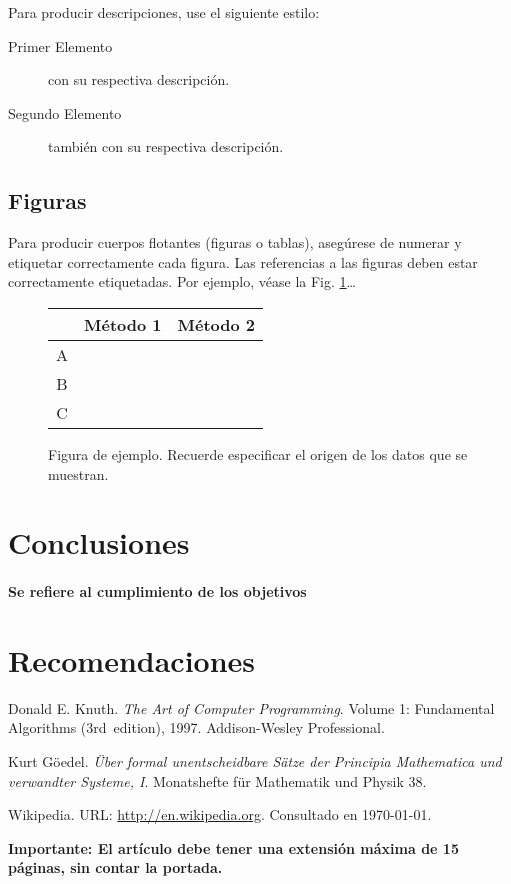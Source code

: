 \documentclass[12pt]{amsart}
\begin{document}
		Para producir descripciones, use el siguiente estilo:

		\begin{description}
			\item [Primer Elemento] con su respectiva descripción.
			\item [Segundo Elemento] también con su respectiva descripción.
		\end{description}

	\subsection{Figuras}\label{sub:figures}
		Para producir cuerpos flotantes (figuras o tablas), asegúrese de numerar
		y etiquetar correctamente cada figura. Las referencias a las figuras deben
		estar correctamente etiquetadas. Por ejemplo, véase la Fig. \ref{fig:ex}\ldots

		\begin{figure}[h!]%
		\begin{center}
			\begin{tabular}{|c|c|c|} \hline
			 			& Método 1 	& Método 2 	\\ \hline
			A 			&  			&  			\\ \hline
			B			& 			& 			\\ \hline
			C 			& 			&  			\\ \hline
			\end{tabular}
		\caption{Figura de ejemplo. Recuerde especificar el origen de los datos que se muestran. \label{fig:ex}}
		\end{center}
		\end{figure}

\section{Conclusiones}

\paragraph{Se refiere al cumplimiento de los objetivos}

\section{Recomendaciones}

\begin{thebibliography}{99}
	 Donald E. Knuth. \emph{The Art of Computer Programming}.
		Volume 1: Fundamental Algorithms (3rd~edition), 1997.
		Addison-Wesley Professional.

	 Kurt Göedel. \emph{Über formal unentscheidbare Sätze der
		Principia Mathematica und verwandter Systeme, I}.
		Monatshefte für Mathematik und Physik 38.

	 Wikipedia. URL: \href{http://en.wikipedia.org}
	  {http://en.wikipedia.org}.
		Consultado en \today.
\end{thebibliography}
\smallskip
\smallskip
\textbf{Importante: El artículo debe tener una extensión máxima de 15 páginas, sin contar la portada.}
\end{document}
